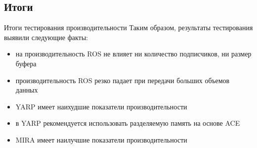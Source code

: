 \subsection{Итоги}
\begin{frame}{Итоги тестирования производительности}
Таким образом, результаты тестирования выявили следующие факты:
\begin{itemize}
	\item на производительность ROS не влияет ни количество подписчиков, ни размер буфера
	\item производительность ROS резко падает при передачи больших объемов данных
	\item YARP имеет наихудшие показатели производительности
	\item в YARP рекомендуется использовать разделяемую память на основе ACE
	\item MIRA имеет наилучшие показатели производительности
\end{itemize}
\end{frame}
